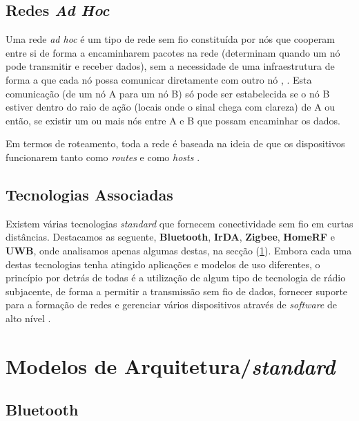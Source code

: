 \documentclass[conference]{IEEEtran}
\begin{document}
\subsection{Redes \textit{Ad Hoc}} \label{redes_ad_hoc}

Uma rede \textit{ad hoc} é um tipo de rede sem fio constituída por nós que cooperam entre si de forma a encaminharem pacotes na rede (determinam quando um nó pode transmitir e receber dados), sem a necessidade de uma infraestrutura de forma a que cada nó possa comunicar diretamente com outro nó \cite{salonidis2005distributed}, \cite{rubinstein2002qualidade}. 
Esta comunicação (de um nó A para um nó B) só pode ser estabelecida se o nó B estiver dentro do raio de ação (locais onde o sinal chega com clareza) de A ou então, se existir um ou mais nós entre A e B que possam encaminhar os dados.

Em termos de roteamento, toda a rede é baseada na ideia de que os dispositivos funcionarem tanto como \textit{routes} e como \textit{hosts} \cite{prasad2004ofdm}.


\subsection{Tecnologias Associadas}

Existem várias tecnologias \textit{standard} que fornecem conectividade sem fio em curtas distâncias. 
Destacamos as seguente, \textbf{Bluetooth}, \textbf{IrDA}, \textbf{Zigbee}, \textbf{HomeRF} e \textbf{UWB}, onde analisamos apenas algumas destas, na secção (\ref{arquiteturas}).
Embora cada uma destas tecnologias tenha atingido aplicações e modelos de uso diferentes, o princípio por detrás de todas é a utilização de algum tipo de tecnologia de rádio subjacente, de forma a permitir a transmissão sem fio de dados, fornecer suporte para a formação de redes e gerenciar vários dispositivos através de \textit{software} de alto nível \cite{prasad2004ofdm}.


\section{Modelos de Arquitetura/\textit{standard}} \label{arquiteturas}

\subsection{Bluetooth} \label{bluetooth}
\end{document}
